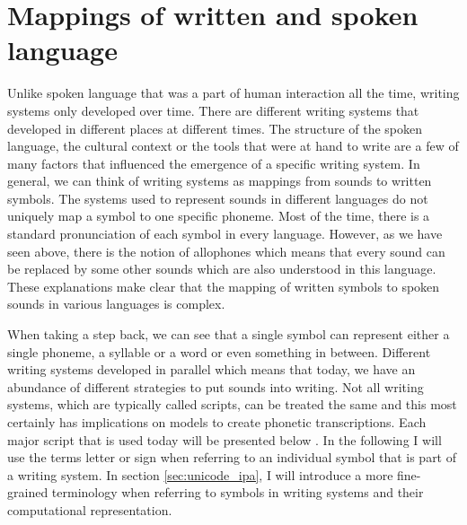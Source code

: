 \section{Mappings of written and spoken language}
\label{writing-sys}
Unlike spoken language that was a part of human interaction all the time, writing systems only developed over time. There are different writing systems that developed in different places at different times. The structure of the spoken language, the cultural context or the tools that were at hand to write are a few of many factors that influenced the emergence of a specific writing system. In general, we can think of writing systems as mappings from sounds to written symbols. The systems used to represent sounds in different languages do not uniquely map a symbol to one specific phoneme. Most of the time, there is a standard pronunciation of each symbol in every language. However, as we have seen above, there is the notion of allophones which means that every sound can be replaced by some other sounds which are also understood in this language. These explanations make clear that the mapping of written symbols to spoken sounds in various languages is complex. 

When taking a step back, we can see that a single symbol can represent either a single phoneme, a syllable or a word or even something in between. Different writing systems developed in parallel which means that today, we have an abundance of different strategies to put sounds into writing. Not all writing systems, which are typically called scripts, can be treated the same and this most certainly has implications on models to create phonetic transcriptions. Each major script that is used today will be presented below . In the following I will use the terms letter or sign when referring to an individual symbol that is part of a writing system. In section \ref{sec:unicode_ipa}, I will introduce a more fine-grained terminology when referring to symbols in writing systems and their computational representation. 


